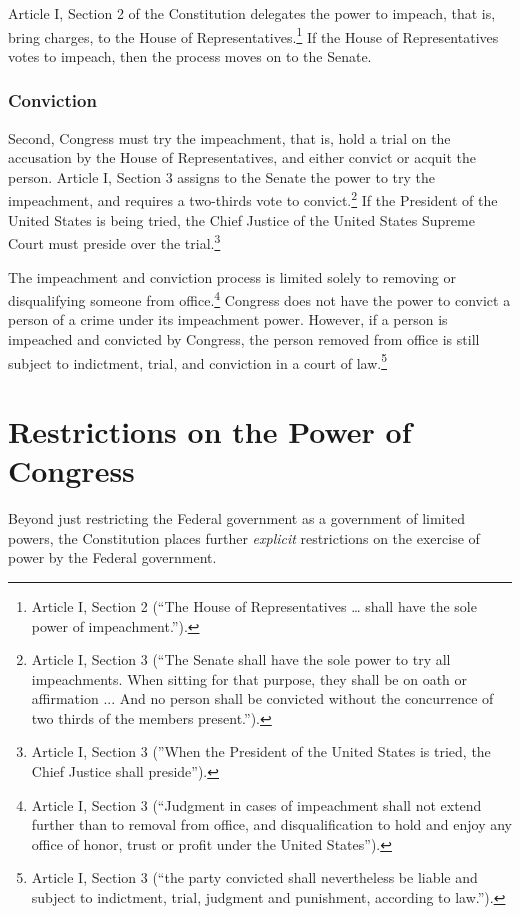 Article I, Section 2 of the Constitution delegates the power to impeach, that is, bring charges, to the House of Representatives.\footnote{Article I, Section 2 (``The House of Representatives … shall have the sole power of impeachment.'').}  If the House of Representatives votes to impeach, then the process moves on to the Senate.

\subsubsection{Conviction}
Second, Congress must try the impeachment, that is, hold a trial on the accusation by the House of Representatives, and either convict or acquit the person.  Article I, Section 3 assigns to the Senate the power to try the impeachment, and requires a two-thirds vote to convict.\footnote{Article I, Section 3 (``The Senate shall have the sole power to try all impeachments. When sitting for that purpose, they shall be on oath or affirmation ...  And no person shall be convicted without the concurrence of two thirds of the members present.'').}
If the President of the United States is being tried, the Chief Justice of the United States Supreme Court must preside over the trial.\footnote{Article I, Section 3 (''When the President of the United States is tried, the Chief Justice shall preside'').}

The impeachment and conviction process is limited solely to removing or disqualifying someone from office.\footnote{Article I, Section 3 (``Judgment in cases of impeachment shall not extend further than to removal from office, and disqualification to hold and enjoy any office of honor, trust or profit under the United States'').}
Congress does not have the power to convict a person of a crime under its impeachment power.  However, if a person is impeached and convicted by Congress, the person removed from office is still subject to indictment, trial, and conviction in a court of law.\footnote{Article I, Section 3 (``the party convicted shall nevertheless be liable and subject to indictment, trial, judgment and punishment, according to law.'').}

\section{Restrictions on the Power of Congress}

Beyond just restricting the Federal government as a government of limited powers, the Constitution places further \textit{explicit} restrictions on the exercise of power by the Federal government.

